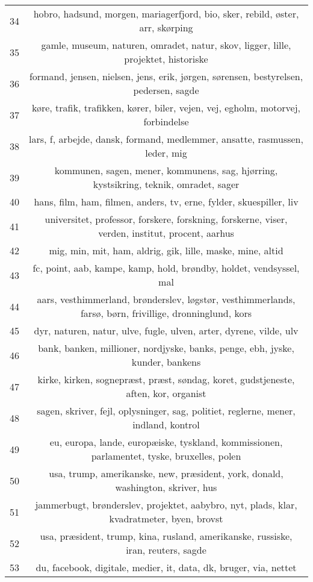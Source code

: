 \begin{longtable}[c]{c | c}
		34 & hobro, hadsund, morgen, mariagerfjord, bio, sker, rebild, øster, arr, skørping \\
		35 & gamle, museum, naturen, omradet, natur, skov, ligger, lille, projektet, historiske \\
		36 & formand, jensen, nielsen, jens, erik, jørgen, sørensen, bestyrelsen, pedersen, sagde \\
		37 & køre, trafik, trafikken, kører, biler, vejen, vej, egholm, motorvej, forbindelse \\
		38 & lars, f, arbejde, dansk, formand, medlemmer, ansatte, rasmussen, leder, mig \\
		39 & kommunen, sagen, mener, kommunens, sag, hjørring, kystsikring, teknik, omradet, sager \\
		40 & hans, film, ham, filmen, anders, tv, erne, fylder, skuespiller, liv \\
		41 & universitet, professor, forskere, forskning, forskerne, viser, verden, institut, procent, aarhus \\
		42 & mig, min, mit, ham, aldrig, gik, lille, maske, mine, altid \\
		43 & fc, point, aab, kampe, kamp, hold, brøndby, holdet, vendsyssel, mal \\
		44 & aars, vesthimmerland, brønderslev, løgstør, vesthimmerlands, farsø, børn, frivillige, dronninglund, kors \\
		45 & dyr, naturen, natur, ulve, fugle, ulven, arter, dyrene, vilde, ulv \\
		46 & bank, banken, millioner, nordjyske, banks, penge, ebh, jyske, kunder, bankens \\
		47 & kirke, kirken, sognepræst, præst, søndag, koret, gudstjeneste, aften, kor, organist \\
		48 & sagen, skriver, fejl, oplysninger, sag, politiet, reglerne, mener, indland, kontrol \\
		49 & eu, europa, lande, europæiske, tyskland, kommissionen, parlamentet, tyske, bruxelles, polen \\
		50 & usa, trump, amerikanske, new, præsident, york, donald, washington, skriver, hus \\
		51 & jammerbugt, brønderslev, projektet, aabybro, nyt, plads, klar, kvadratmeter, byen, brovst \\
		52 & usa, præsident, trump, kina, rusland, amerikanske, russiske, iran, reuters, sagde \\
		53 & du, facebook, digitale, medier, it, data, dk, bruger, via, nettet \\

\end{longtable}
